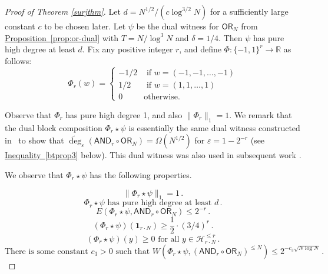 \documentclass[11pt]{article}
\numberwithin{equation}{section}
\theoremstyle{definition}
\theoremstyle{plain}
\newcommand{\expref}[2]{\hyperref[#2]{#1~\ref{#2}}}
\newcommand{\expeqref}[2]{\hyperref[#2]{#1~\eqref{#2}}}
\newcommand{\reals}{\mathbb{R}}
\newcommand{\OR}{\mathsf{ OR}}
\newcommand{\bits}{\{-1,1\}}
\newcommand{\ls}{\star}
\newcommand{\eps}{\varepsilon}
\newcommand{\Hcal}{\mathcal{H}}
\newcommand{\adeg}{\widetilde{\operatorname{deg}}}
\newcommand{\AND}{\mathsf{AND}}
\begin{document}
%
%
%
%
\begin{proof}[Proof of Theorem \ref{surjthm}]
	Let $d=N^{1/2}/(c \log^{3/2} N)$ for a sufficiently large constant $c$ to be chosen later. 
	Let 
	$\psi$ be the dual witness for $\OR_{N}$ from \expref{Proposition}{prop:or-dual} with $T=N/\log^3 N$ and $\delta=1/4$. 
	Then $\psi$ has pure high degree at least $d$. %
	Fix any positive integer $r$, and 
	define $\Phi \colon \bits^{r} \to \reals$ as follows:
	$$\Phi_r(w) = \begin{cases}
	-1/2 & \text{ if } w=(-1, -1, \dots, -1)\\
	1/2 & \text{ if } w= (1, 1, \dots, 1)\\
	0 & \text{otherwise}.
	\end{cases}$$
	
Observe that $\Phi_r$ has pure high degree 1, and also $\|\Phi_r\|_1=1$. 
We remark that the dual block composition $\Phi_r \ls \psi$ is essentially the same dual witness constructed in~\cite{bt14} to show that
$\adeg_{\eps}(\AND_r \circ\OR_N) = \Omega(N^{1/2})$ for
$\eps = 1-2^{-r}$ (see \expeqref{Inequality}{btprop3} below).
This dual witness was also used in subsequent
work \cite{sherstov14, bchtv, bkt}.
	
%
%
We observe that $\Phi_r \ls \psi$ has the following properties. %
%

	\begin{equation}  \label{btprop1}
	\|\Phi_r \ls \psi\|_1=1\,.
	\end{equation}
	\begin{equation}  \label{btprop2}
	\Phi_r \ls \psi \text{ has pure high degree at least } d\,.
	\end{equation}
	\begin{equation}  \label{btprop3}
	E(\Phi_r \ls \psi, \AND_r \circ \OR_N) \leq 2^{-r}\,.
	\end{equation}
	\begin{equation}  \label{btprop4}
	\left(\Phi_r \ls \psi\right)\left(\mathbf{1}_{r \cdot N}\right) \geq \frac12 \cdot (3/4)^{r}\,.
	\end{equation}
	\begin{equation} \label{btprop5}
	\left(\Phi_r \ls \psi\right)(y) \geq 0 \text{ for all } y \in \Hcal_{r \cdot N}^{\leq r}\,. 
	\end{equation}
	\begin{equation} \label{btprop6}
\text{There is some constant } c_3>0 \text{ such that } W(\Phi_r \ls \psi, (\AND_r \circ \OR_N)^{\leq N}) \leq 2^{-c_3 \sqrt{N \log N}}\,.
	\end{equation}
	

\end{proof}
\end{document}
